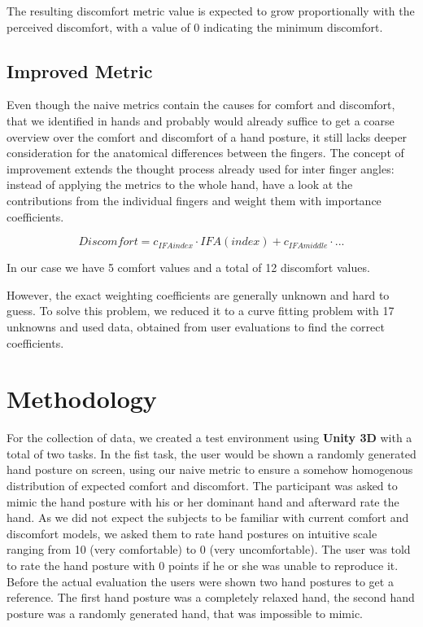 \documentclass{sig-alternate-05-2015}
\begin{document}
The resulting discomfort metric value is expected to grow proportionally with the perceived discomfort, with a value of 0 indicating the minimum discomfort. 

\subsection{Improved Metric}

Even though the naive metrics contain the causes for comfort and discomfort, that we identified in hands and probably would already suffice to get a coarse overview over the comfort and discomfort of a hand posture, it still lacks deeper consideration for the anatomical differences between the fingers.
The concept of improvement extends the thought process already used for inter finger angles: instead of applying the metrics to the whole hand, have a look at the contributions from the individual fingers and weight them with importance coefficients. 

	\[
	Discomfort = c_{IFAindex}\cdot IFA(index)  +  c_{IFAmiddle}\cdot...
	\]

In our case we have 5 comfort values and a total of 12 discomfort values. 

However, the exact weighting coefficients are generally unknown and hard to guess. To solve this problem, we reduced it to a curve fitting problem with 17 unknowns and used data, obtained from user evaluations to find the correct coefficients.

\section{Methodology}

For the collection of data, we created a test environment using \textbf{Unity 3D} with a total of two tasks. In the fist task, the user would be shown a randomly generated hand posture on screen, using our naive metric to ensure a somehow homogenous distribution of expected comfort and discomfort. The participant was asked to mimic the hand posture with his or her dominant hand and afterward rate the hand. As we did not expect the subjects to be familiar with current comfort and discomfort models, we asked them to rate hand postures on intuitive scale ranging from 10 (very comfortable) to 0 (very uncomfortable). The user was told to rate the hand posture with 0 points if he or she was unable to reproduce it. Before the actual evaluation the users were shown two hand postures to get a reference. The first hand posture was a completely relaxed hand, the second hand posture was a randomly generated hand, that was impossible to mimic.
\end{document}
